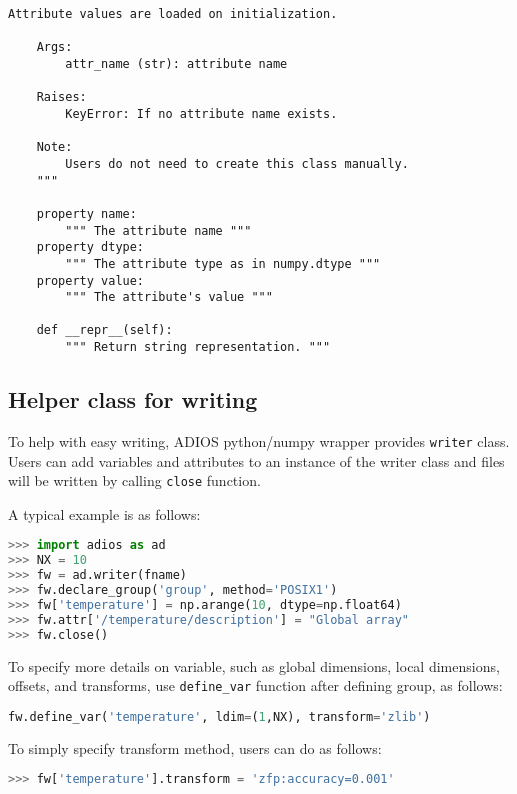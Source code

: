 \begin{lstlisting}[language=cython,caption={Read functions},label={},]
    Attribute values are loaded on initialization.

    Args:
        attr_name (str): attribute name

    Raises:
        KeyError: If no attribute name exists.

    Note:
        Users do not need to create this class manually.        
    """

    property name:
        """ The attribute name """
    property dtype:
        """ The attribute type as in numpy.dtype """
    property value:
        """ The attribute's value """

    def __repr__(self):
        """ Return string representation. """
\end{lstlisting}

\subsection{Helper class for writing}
\label{sec:numpy-helper-class}
To help with easy writing, ADIOS python/numpy wrapper provides \verb+writer+ class. Users can add variables and attributes to an instance of the writer class and files will be written by calling \verb+close+ function.

A typical example is as follows:
\begin{lstlisting}[language=Python,caption={An example of the use of the writer class},label={},]
>>> import adios as ad
>>> NX = 10
>>> fw = ad.writer(fname)
>>> fw.declare_group('group', method='POSIX1')
>>> fw['temperature'] = np.arange(10, dtype=np.float64)
>>> fw.attr['/temperature/description'] = "Global array"
>>> fw.close()
\end{lstlisting}

To specify more details on variable, such as global dimensions, local dimensions, offsets, and transforms, use \verb+define_var+ function after defining group, as follows:
\begin{lstlisting}[language=Python,caption={An example of define var function},label={},]
fw.define_var('temperature', ldim=(1,NX), transform='zlib')
\end{lstlisting}

To simply specify transform method, users can do as follows:
\begin{lstlisting}[language=Python,caption={An example of using transform method},label={},]
>>> fw['temperature'].transform = 'zfp:accuracy=0.001'
\end{lstlisting}

